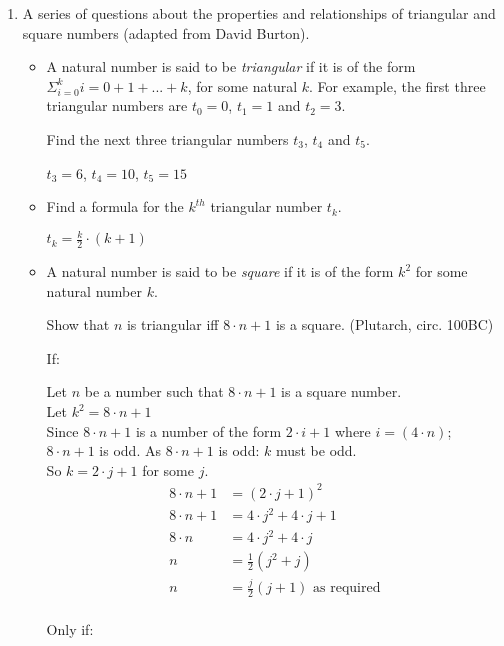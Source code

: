 \documentclass[10pt,\jkfside,a4paper]{article}
\begin{document}
\begin{enumerate}

\item A series of questions about the properties and relationships of triangular and 
square numbers (adapted from David Burton).

\begin{itemize}

\item A natural number is said to be \textit{triangular} if it is of the form $\Sigma^k_{i=0}i=0+1+...+k$, for 
some natural $k$. For example, the first three triangular numbers are $t_0=0$, $t_1=1$ and $t_2=3$.

Find the next three triangular numbers $t_3$, $t_4$ and $t_5$.

$t_3 = 6$, $t_4 = 10$, $t_5 = 15$

\item Find a formula for the $k^{th}$ triangular number $t_k$.

$t_k = \frac{k}{2}\cdot(k + 1)$

\item A natural number is said to be \textit{square} if it is of the form $k^2$ for some natural 
number $k$.

Show that $n$ is triangular iff $8\cdot n + 1$ is a square. (Plutarch, circ. 100BC)

If:

Let $n$ be a number such that $8\cdot n + 1$ is a square number.\\
Let $k^2 = 8\cdot n + 1$\\
Since $8\cdot n + 1$ is a number of the form $2\cdot i + 1$ where $i = (4\cdot n)$; 
$8\cdot n + 1$ is odd. As $8\cdot n + 1$ is odd: $k$ must be odd.\\
So $k = 2\cdot j + 1$ for some $j$.\\
\begin{equation}
\begin{split}
8\cdot n + 1 &= (2\cdot j + 1)^2\\
8\cdot n + 1 &= 4\cdot j^2 + 4\cdot j + 1\\
8\cdot n 	 &= 4\cdot j^2 + 4\cdot j\\
n			 &= \frac{1}{2}(j^2 + j)\\
n			 &= \frac{j}{2}(j + 1) \text{ as required}\\
\end{split}
\end{equation}

Only if:


\end{itemize}
\end{enumerate}
\end{document}
